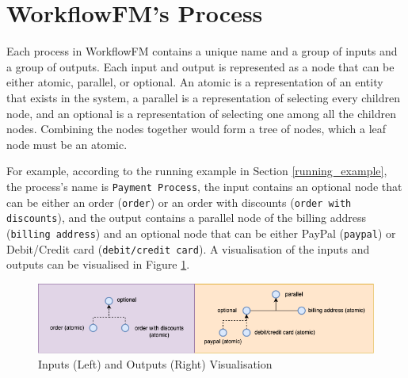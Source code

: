 \section{WorkflowFM's Process}
\label{background:input_output}

Each process in WorkflowFM contains a unique name and a group of inputs and a group of outputs. Each input and output is represented as a node that can be either atomic, parallel, or optional. 
An atomic is a representation of an entity \cite{entity} that exists in the system,
a parallel is a representation of selecting every children node,
and an optional is a representation of selecting one among all the children nodes.
Combining the nodes together would form a tree of nodes, which a leaf node must be an atomic.

For example, according to the running example in Section \ref{running_example}, the process's name is \verb!Payment Process!, the input contains an optional node that can be either an order (\verb!order!) or an order with discounts (\verb!order with discounts!), and the output contains a parallel node of the billing address (\verb!billing address!) and an optional node that can be either PayPal (\verb!paypal!) or Debit/Credit card (\verb!debit/credit card!). A visualisation of the inputs and outputs can be visualised in Figure \ref{fig:type_nodes_example}.

\begin{figure}[ht!]
    \centering
    \includegraphics[width=\textwidth]{overleaf/images/type_nodes_example.png}
    \caption{Inputs (Left) and Outputs (Right) Visualisation}
    \label{fig:type_nodes_example}
\end{figure}



